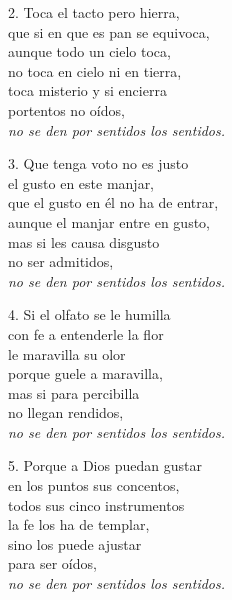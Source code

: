 \begin{blocklyrics}
2. Toca el tacto pero hierra,\\
que si en que es pan se equivoca,\\
aunque todo un cielo toca,\\
no toca en cielo ni en tierra,\\
toca misterio y si encierra\\
portentos no oídos,\\
\emph{no se den por sentidos los sentidos.}

3. Que tenga voto no es justo\\
el gusto en este manjar,\\
que el gusto en él no ha de entrar,\\
aunque el manjar entre en gusto,\\
mas si les causa disgusto\\
no ser admitidos,\\
\emph{no se den por sentidos los sentidos.}

4. Si el olfato se le humilla\\
con fe a entenderle la flor\\
le maravilla su olor\\
porque guele a maravilla,\\
mas si para percibilla\\
no llegan rendidos,\\
\emph{no se den por sentidos los sentidos.}

5. Porque a Dios puedan gustar\\
en los puntos sus concentos,\\
todos sus cinco instrumentos\\
la fe los ha de templar,\\
sino los puede ajustar\\
para ser oídos,\\
\emph{no se den por sentidos los sentidos.}
\end{blocklyrics}
